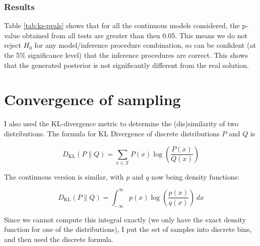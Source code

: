 \subsubsection{Results}

Table \ref{tab:ks-pvals} shows that for all the continuous models considered, the p-value obtained from all tests are greater than then 0.05. This means we do not reject $H_0$ for any model/inference procedure combination, so can be confident (at the 5\% significance level) that the inference procedures are correct. This shows that the generated posterior is not significantly different from the real solution.

\begin{table}[!ht]
	\centering
	\caption{p-values of K-S test on different models using different inference procedures}
	\label{tab:ks-pvals}
\end{table}


\section{Convergence of sampling}
I also used the KL-divergence metric to determine the (dis)similarity of two distributions. The formula for KL Divergence of discrete distributions $P$ and $Q$ is

$${D_{\text{KL}}(P\parallel Q)=\sum _{x\in {\mathcal {X}}}P(x)\log \left({\frac {P(x)}{Q(x)}}\right)}$$

The continuous version is similar, with $p$ and $q$ now being density functions:

$${D_\text{KL}}(P\parallel Q)=\int _{-\infty }^{\infty }p(x)\log \left({\frac {p(x)}{q(x)}}\right)\,dx$$

Since we cannot compute this integral exactly (we only have the exact density function for one of the distributions), I put the set of samples into discrete bins, and then used the discrete formula.


